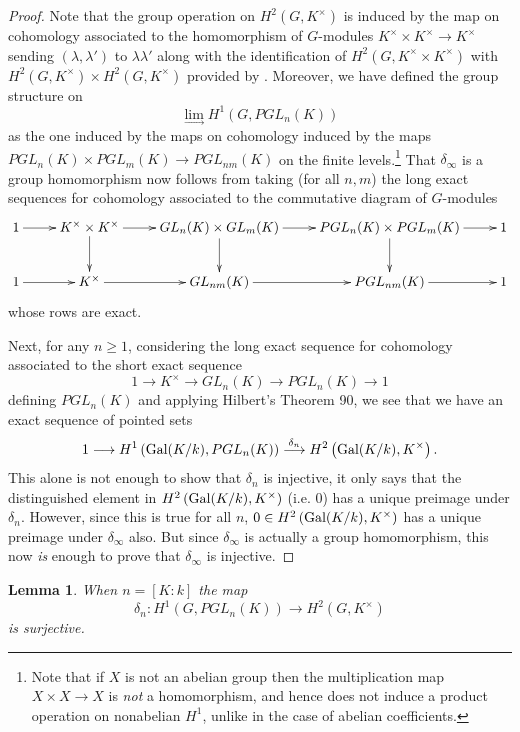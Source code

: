 \documentclass[11pt]{amsart}
\numberwithin{equation}{section}
\newtheorem{lemma}[equation]{Lemma}
\theoremstyle{remark}
\theoremstyle{remark}
\theoremstyle{remark}
\theoremstyle{definition}
\theoremstyle{definition}
\theoremstyle{definition}
\theoremstyle{definition}
\theoremstyle{definition}
\theoremstyle{definition}
\begin{document}
\begin{proof}
Note that the group operation on $H^2(G,K^\times)$ is induced by the map on cohomology associated to the homomorphism of $G$-modules
$K^\times \times K^\times \rightarrow K^\times$
sending $(\lambda, \lambda')$ to $\lambda \lambda'$ along with the identification of $H^2\left(G,K^\times \times K^\times\right)$ with $H^2\left(G,K^\times\right)\times H^2\left(G,K^\times\right)$ provided by . Moreover, we have defined the group structure on \[\lim_{\rightarrow}H^1\left(G,PGL_n(K)\right)\] as the one induced by the maps on cohomology induced by the maps $PGL_n(K)\times PGL_m(K)\rightarrow PGL_{nm}(K)$ on the finite levels.\footnote{Note that if $X$ is not an abelian group then the multiplication map $X\times X\rightarrow X$ is \textit{not} a homomorphism, and hence does not induce a product operation on nonabelian $H^1$, unlike in the case of abelian coefficients.} That $\delta_\infty$ is a group homomorphism now follows from taking (for all $n,m$) the long exact sequences for cohomology associated to the commutative diagram of $G$-modules
\[\xymatrix{1\ar[r] &K^{\times}\times K^{\times} \ar[d]\ar[r]& GL_n(K)\times GL_m(K)\ar[r]\ar[d]& PGL_{n}(K)\times PGL_m(K)\ar[r]\ar[d]&1\\
1 \ar[r]& K^{\times} \ar[r]& GL_{nm}(K)\ar[r]& PGL_{nm}(K)\ar[r]&1}\]
whose rows are exact.

Next, for any $n\geq 1$, considering the long exact sequence for cohomology associated to the short exact sequence
\[1\longrightarrow K^{\times} \longrightarrow GL_n(K)\longrightarrow PGL_n(K)\longrightarrow 1\]
defining $PGL_n(K)$ and applying Hilbert's Theorem 90, we see that we have an exact sequence of pointed sets
\[1\longrightarrow H^1\left(\textup{Gal}(K/k),PGL_n(K)\right)\stackrel{\delta_n}{\longrightarrow} H^2\left(\textup{Gal}(K/k),K^{\times}\right).\]
 This  alone is not enough to show that $\delta_n$ is injective, it only says that the distinguished element in $H^2\left(\textup{Gal}(K/k),K^{\times}\right)$ (i.e. $0$) has a unique preimage under $\delta_n$. However, since this is true for all $n$, $0\in H^2\left(\textup{Gal}(K/k),K^{\times}\right)$ has a unique preimage under $\delta_\infty$ also. But since $\delta_\infty$ is actually a group homomorphism, this now \textit{is} enough to prove that $\delta_\infty$ is injective. 
\end{proof}

\begin{lemma} \label{surprise surjection}
When $n=[K:k]$ the map 
\[\delta_n:H^1\left(G,PGL_n(K)\right)\longrightarrow H^2\left(G,K^{\times}\right)\]
is surjective.
\end{lemma}
\end{document}
